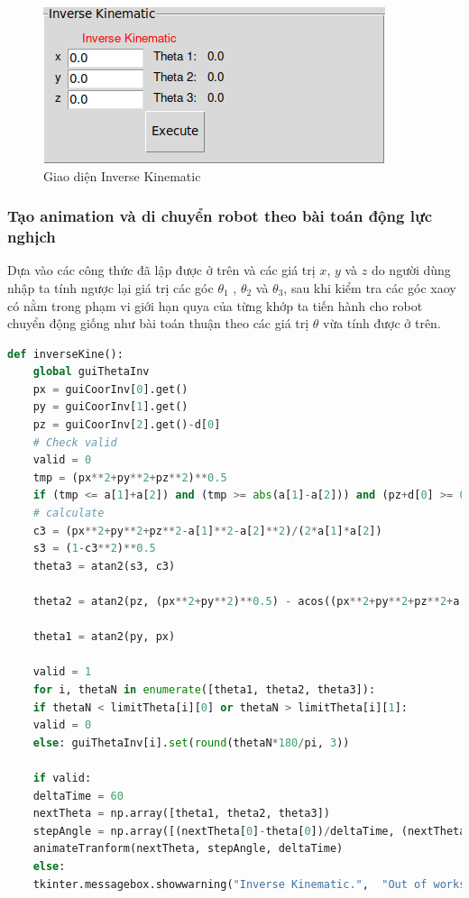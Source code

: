 \begin{figure}[H]
	\centering
	\includegraphics[width=1\linewidth]{Images/inv_ui.png}
	\caption{Giao diện Inverse Kinematic}
	\label{fig:enter-label8}
\end{figure}

\subsubsection{Tạo animation và di chuyển robot theo bài toán động lực nghịch}

Dựa vào các công thức đã lập được ở trên và các giá trị $x$, $y$ và $z$ do người dùng nhập ta tính ngược lại giá trị các góc $\theta_{1}$ , $\theta_{2}$ và $\theta_{3}$, sau khi kiểm tra các góc xaoy có nằm trong phạm vi giới hạn quya của từng khớp ta tiến hành cho robot chuyển động giống như bài toán thuận theo các giá trị $\theta$ vừa tính được ở trên.

\vspace{0.5cm}
\begin{lstlisting}[language=python]
	def inverseKine():
	global guiThetaInv
	px = guiCoorInv[0].get()
	py = guiCoorInv[1].get()
	pz = guiCoorInv[2].get()-d[0]
	# Check valid
	valid = 0
	tmp = (px**2+py**2+pz**2)**0.5
	if (tmp <= a[1]+a[2]) and (tmp >= abs(a[1]-a[2])) and (pz+d[0] >= 0): 
	# calculate
	c3 = (px**2+py**2+pz**2-a[1]**2-a[2]**2)/(2*a[1]*a[2])
	s3 = (1-c3**2)**0.5
	theta3 = atan2(s3, c3)
	
	theta2 = atan2(pz, (px**2+py**2)**0.5) - acos((px**2+py**2+pz**2+a[1]**2-a[2]**2)/(2*a[1]*(px**2+py**2+pz**2)**0.5))
	
	theta1 = atan2(py, px)
	
	valid = 1
	for i, thetaN in enumerate([theta1, theta2, theta3]):
	if thetaN < limitTheta[i][0] or thetaN > limitTheta[i][1]:
	valid = 0
	else: guiThetaInv[i].set(round(thetaN*180/pi, 3))
	
	if valid:
	deltaTime = 60
	nextTheta = np.array([theta1, theta2, theta3])
	stepAngle = np.array([(nextTheta[0]-theta[0])/deltaTime, (nextTheta[1]-theta[1])/deltaTime, (nextTheta[2]-theta[2])/deltaTime])
	animateTranform(nextTheta, stepAngle, deltaTime)
	else:
	tkinter.messagebox.showwarning("Inverse Kinematic.",  "Out of workspace")
\end{lstlisting}

